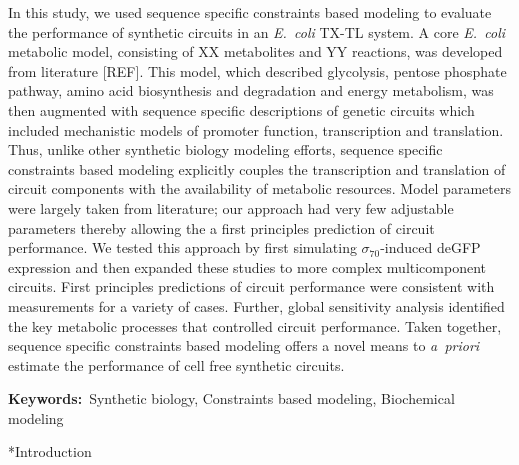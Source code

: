 \documentclass[12pt]{article}
\makeatletter
\renewcommand\section{\@startsection
	{subsection}{2}{0mm}
	{-0.2in}
	{0.05\baselineskip}
	{\normalfont\large\bfseries}}
\makeatother
\begin{document}
In this study, we used sequence specific constraints based modeling to evaluate the performance of synthetic circuits in an \emph{E.~coli} TX-TL system.
A core \emph{E.~coli} metabolic model, consisting of XX metabolites and YY reactions, was developed from literature [REF].
This model, which described glycolysis, pentose phosphate pathway, amino acid biosynthesis and degradation and energy metabolism, was then augmented with
sequence specific descriptions of genetic circuits which included mechanistic models of promoter function, transcription and translation.
Thus, unlike other synthetic biology modeling efforts, sequence specific constraints based modeling explicitly couples
the transcription and translation of circuit components with the availability of metabolic resources.
Model parameters were largely taken from literature; our approach had very few adjustable parameters thereby allowing the a first principles prediction of circuit performance.
We tested this approach by first simulating $\sigma_{70}$-induced deGFP expression and then expanded these studies to more complex multicomponent circuits.
First principles predictions of circuit performance were consistent with measurements for a variety of cases.
Further, global sensitivity analysis identified the key metabolic processes that controlled circuit performance.
Taken together, sequence specific constraints based modeling offers a novel means to \emph{a~priori} estimate the performance of cell free synthetic circuits.

\vspace{0.1in}
{\noindent \textbf{Keywords:}~Synthetic biology, Constraints based modeling, Biochemical modeling}


\pagebreak

\setcounter{page}{1}

\linenumbers


\section*{Introduction}
\end{document}
